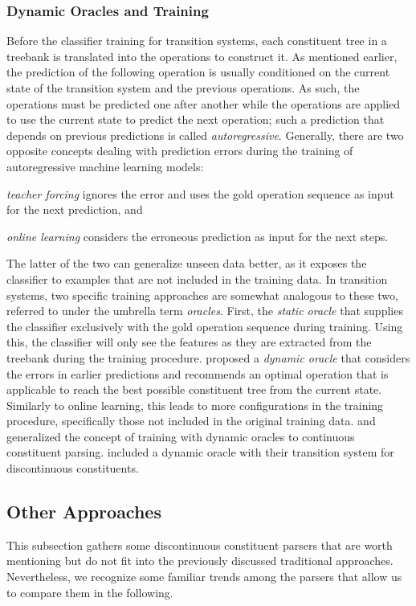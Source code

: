 \documentclass[../document.tex]{subfiles}
\begin{document}
    \subsubsection*{Dynamic Oracles and Training}
    Before the classifier training for transition systems, each constituent tree in a treebank is translated into the operations to construct it.
    As mentioned earlier, the prediction of the following operation is usually conditioned on the current state of the transition system and the previous operations.
    As such, the operations must be predicted one after another while the operations are applied to use the current state to predict the next operation; such a prediction that depends on previous predictions is called \emph{autoregressive}.
    Generally, there are two opposite concepts dealing with prediction errors during the training of autoregressive machine learning models:
    \begin{compactitem}
        \item \emph{teacher forcing} ignores the error and uses the gold operation sequence as input for the next prediction, and
        \item \emph{online learning} considers the erroneous prediction as input for the next steps.
    \end{compactitem}
    The latter of the two can generalize unseen data better, as it exposes the classifier to examples that are not included in the training data.
    In transition systems, two specific training approaches are somewhat analogous to these two, referred to under the umbrella term \emph{oracles}.
    First, the \emph{static oracle} that supplies the classifier exclusively with the gold operation sequence during training.
    Using this, the classifier will only see the features as they are extracted from the treebank during the training procedure.
     proposed a \emph{dynamic oracle} that considers the errors in earlier predictions and recommends an optimal operation that is applicable to reach the best possible constituent tree from the current state.
    Similarly to online learning, this leads to more configurations in the training procedure, specifically those not included in the original training data.
     and \citet{Cross16} generalized the concept of training with dynamic oracles to continuous constituent parsing.
     included a dynamic oracle with their transition system for discontinuous constituents.

    \subsection{Other Approaches}\label{sec:literature:others}
    This subsection gathers some discontinuous constituent parsers that are worth mentioning but do not fit into the previously discussed traditional approaches.
    Nevertheless, we recognize some familiar trends among the parsers that allow us to compare them in the following.
\end{document}
